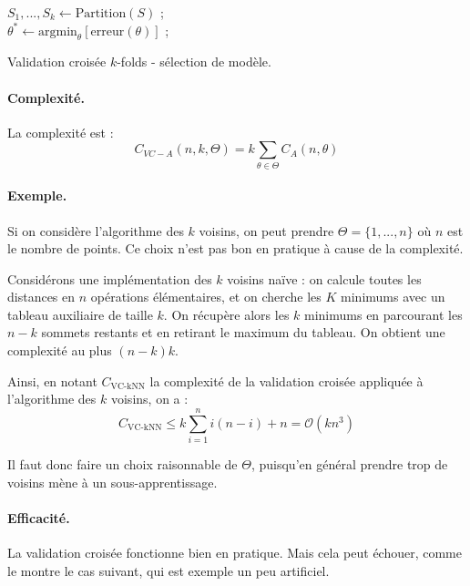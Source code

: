 \begin{algorithm}[!h]\label{validation}

$S_1,...,S_k \leftarrow \text{Partition}(S)$ ;\\
$\theta^* \leftarrow \text{argmin}_{\theta}[\text{erreur}(\theta)]$ ;\\
\caption{Validation croisée $k$-folds - sélection de modèle.}
\end{algorithm}

\paragraph{Complexité.} La complexité est :
$$
C_{VC-A}(n,k,\Theta) = k \sum_{\theta\in \Theta} C_A(n,\theta)
$$

\paragraph{Exemple.} Si on considère l'algorithme des $k$ voisins, on peut prendre $\Theta=\{1,...,n\}$ où $n$ est le nombre de points. Ce choix n'est pas bon en pratique à cause de la complexité.

Considérons une implémentation des $k$ voisins naïve : on calcule toutes les distances en $n$ opérations élémentaires, et on cherche les $K$ minimums avec un tableau auxiliaire de taille $k$. On récupère alors les $k$ minimums en parcourant les $n-k$ sommets restants et en retirant le maximum du tableau. On obtient une complexité au plus $(n-k) k$.

Ainsi, en notant $C_{\text{VC-kNN}}$ la complexité de la validation croisée appliquée à l'algorithme des $k$ voisins, on a :
$$
C_{\text{VC-kNN}} \leq k \sum_{i=1}^n i(n-i) + n = \mathcal{O}(kn^3)
$$

Il faut donc faire un choix raisonnable de $\Theta$, puisqu'en général prendre trop de voisins mène à un sous-apprentissage.

\paragraph{Efficacité.} La validation croisée fonctionne bien en pratique. Mais cela peut échouer, comme le montre le cas suivant, qui est exemple un peu artificiel.

